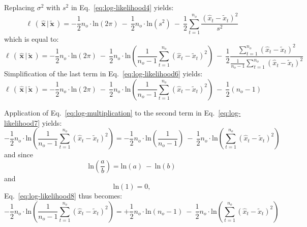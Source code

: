 Replacing $\sigma^2$ with $s^2$ in Eq.~\ref{eq:log-likelihood4} yields:
\begin{equation}\label{eq:log-likelihood4}
\ell\,(\,\hat{\mathbf{x}}\,|\,\tilde{\mathbf{x}}\,) = -\frac{1}{2}n_o\cdot{}\mathrm{ln}\left(2\pi\right)\:-\:\frac{1}{2}n_o\cdot{}\mathrm{ln}\left(s^2\right)\:-\:\frac{1}{2}\sum_{t=1}^{n_o}\frac{\left(\hat{x}_t-\tilde{x}_t\right)^2}{s^2}
\end{equation}
which is equal to:
\begin{equation}\label{eq:log-likelihood6}
\ell\,(\,\hat{\mathbf{x}}\,|\,\tilde{\mathbf{x}}\,) = -\frac{1}{2}n_o\cdot{}\mathrm{ln}\left(2\pi\right)\:-\:\frac{1}{2}n_o\cdot{}\mathrm{ln}\left(\frac{1}{n_o-1}\sum_{t=1}^{n_o}\left(\hat{x}_t-\tilde{x}_t\right)^2\right)\:-\:\frac{1}{2}\frac{\sum_{t=1}^{n_o}\left(\hat{x}_t-\tilde{x}_t\right)^2}{\frac{1}{n_o-1}\sum_{t=1}^{n_o}\left(\hat{x}_t-\tilde{x}_t\right)^2}
\end{equation}
Simplification of the last term in Eq.~\ref{eq:log-likelihood6} yields:
\begin{equation}\label{eq:log-likelihood7}
\ell\,(\,\hat{\mathbf{x}}\,|\,\tilde{\mathbf{x}}\,) = -\frac{1}{2}n_o\cdot{}\mathrm{ln}\left(2\pi\right)\:-\:\frac{1}{2}n_o\cdot{}\mathrm{ln}\left(\frac{1}{n_o-1}\sum_{t=1}^{n_o}\left(\hat{x}_t-\tilde{x}_t\right)^2\right)\:-\:\frac{1}{2}\left(n_o-1\right)
\end{equation}

Application of Eq.~\ref{eq:log-multiplication} to the second term in Eq.~\ref{eq:log-likelihood7} yields:
\begin{equation}\label{eq:log-likelihood8}
-\frac{1}{2}n_o\cdot{}\mathrm{ln}\left(\frac{1}{n_o-1}\sum_{t=1}^{n_o}\left(\hat{x}_t-\tilde{x}_t\right)^2\right) = -\frac{1}{2}n_o\cdot{}\mathrm{ln}\left(\frac{1}{n_o-1}\right)\:-\:\frac{1}{2}n_o\cdot{}\mathrm{ln}\left(\sum_{t=1}^{n_o}\left(\hat{x}_t-\tilde{x}_t\right)^2\right)
\end{equation}
and since
\begin{equation}\label{eq:log-division}
\mathrm{ln}\left(\frac{a}{b}\right) = \mathrm{ln}\left(a\right)\:-\:\mathrm{ln}\left(b\right)
\end{equation}
and
\begin{equation}\label{eq:log1}
\mathrm{ln}(1) = 0,
\end{equation}
Eq.~\ref{eq:log-likelihood8} thus becomes:
\begin{equation}\label{eq:log-likelihood9}
-\frac{1}{2}n_o\cdot{}\mathrm{ln}\left(\frac{1}{n_o-1}\sum_{t=1}^{n_o}\left(\hat{x}_t-\tilde{x}_t\right)^2\right) = +\frac{1}{2}n_o\cdot{}\mathrm{ln}\left(n_o-1\right)\:-\:\frac{1}{2}n_o\cdot{}\mathrm{ln}\left(\sum_{t=1}^{n_o}\left(\hat{x}_t-\tilde{x}_t\right)^2\right)
\end{equation}

